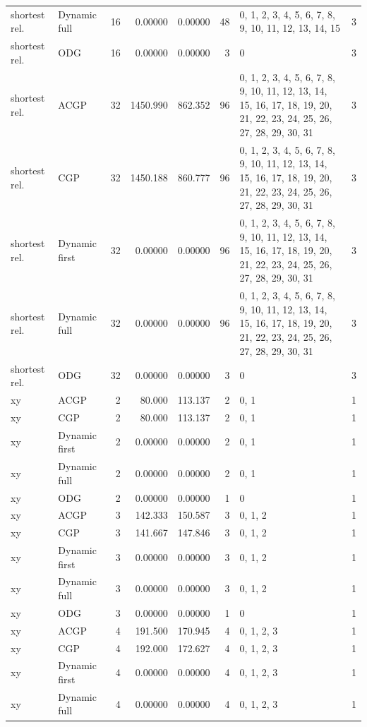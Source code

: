 \documentclass[10pt,a4paper]{article}
\begin{document}
\begin{longtable}{@{}p{23mm}p{29mm}rrrrp{36mm}r@{}}
shortest rel. & Dynamic full & 16 & 0.00000 & 0.00000 & 48 & 0, 1, 2, 3, 4, 5, 6, 7, 8, 9, 10, 11, 12, 13, 14, 15 & 3 \\
shortest rel. & ODG & 16 & 0.00000 & 0.00000 & 3 & 0 & 3 \\
shortest rel. & ACGP & 32 & 1450.990 & 862.352 & 96 & 0, 1, 2, 3, 4, 5, 6, 7, 8, 9, 10, 11, 12, 13, 14, 15, 16, 17, 18, 19, 20, 21, 22, 23, 24, 25, 26, 27, 28, 29, 30, 31 & 3 \\
shortest rel. & CGP & 32 & 1450.188 & 860.777 & 96 & 0, 1, 2, 3, 4, 5, 6, 7, 8, 9, 10, 11, 12, 13, 14, 15, 16, 17, 18, 19, 20, 21, 22, 23, 24, 25, 26, 27, 28, 29, 30, 31 & 3 \\
shortest rel. & Dynamic first & 32 & 0.00000 & 0.00000 & 96 & 0, 1, 2, 3, 4, 5, 6, 7, 8, 9, 10, 11, 12, 13, 14, 15, 16, 17, 18, 19, 20, 21, 22, 23, 24, 25, 26, 27, 28, 29, 30, 31 & 3 \\
shortest rel. & Dynamic full & 32 & 0.00000 & 0.00000 & 96 & 0, 1, 2, 3, 4, 5, 6, 7, 8, 9, 10, 11, 12, 13, 14, 15, 16, 17, 18, 19, 20, 21, 22, 23, 24, 25, 26, 27, 28, 29, 30, 31 & 3 \\
shortest rel. & ODG & 32 & 0.00000 & 0.00000 & 3 & 0 & 3 \\
xy & ACGP & 2 & 80.000 & 113.137 & 2 & 0, 1 & 1 \\
xy & CGP & 2 & 80.000 & 113.137 & 2 & 0, 1 & 1 \\
xy & Dynamic first & 2 & 0.00000 & 0.00000 & 2 & 0, 1 & 1 \\
xy & Dynamic full & 2 & 0.00000 & 0.00000 & 2 & 0, 1 & 1 \\
xy & ODG & 2 & 0.00000 & 0.00000 & 1 & 0 & 1 \\
xy & ACGP & 3 & 142.333 & 150.587 & 3 & 0, 1, 2 & 1 \\
xy & CGP & 3 & 141.667 & 147.846 & 3 & 0, 1, 2 & 1 \\
xy & Dynamic first & 3 & 0.00000 & 0.00000 & 3 & 0, 1, 2 & 1 \\
xy & Dynamic full & 3 & 0.00000 & 0.00000 & 3 & 0, 1, 2 & 1 \\
xy & ODG & 3 & 0.00000 & 0.00000 & 1 & 0 & 1 \\
xy & ACGP & 4 & 191.500 & 170.945 & 4 & 0, 1, 2, 3 & 1 \\
xy & CGP & 4 & 192.000 & 172.627 & 4 & 0, 1, 2, 3 & 1 \\
xy & Dynamic first & 4 & 0.00000 & 0.00000 & 4 & 0, 1, 2, 3 & 1 \\
xy & Dynamic full & 4 & 0.00000 & 0.00000 & 4 & 0, 1, 2, 3 & 1 \\

\end{longtable}
\end{document}
